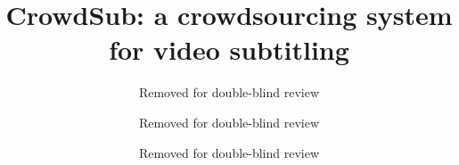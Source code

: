\documentclass[sigconf]{acmart}
\begin{document}
\title{CrowdSub: a crowdsourcing system for video subtitling}


\author{Removed for double-blind review}

\author{Removed for double-blind review}

\author{Removed for double-blind review}


\renewcommand{\shortauthors}{Removed for double-blind review}


\begin{abstract}
	
\end{abstract}
\end{document}
